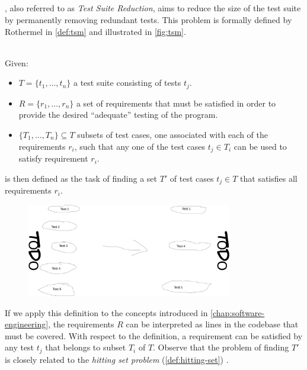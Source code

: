 
\subsection{\tsm{}}
\label{ssec:tsm}
\tsm{}, also referred to as \emph{Test Suite Reduction}, aims to reduce the size of the test suite by permanently removing redundant tests. This problem is formally defined by Rothermel in \autoref{def:tsm} \cite{10.1002/stv.430} and illustrated in \autoref{fig:tsm}. 

\begin{definition}[\tsm{}]
\label{def:tsm}
\mbox{}\\Given:
\begin{itemize}
	\item $T = \{t_1, \dots, t_n\}$ a test suite consisting of tests $t_j$.
	\item $R = \{r_1, \dots, r_n\}$ a set of requirements that must be satisfied in order to provide the desired ``adequate'' testing of the program.
	\item $\{T_1, \dots, T_n\} \subseteq T$ subsets of test cases, one associated with each of the requirements $r_i$, such that any one of the test cases $t_j \in T_i$ can be used to satisfy requirement $r_i$.
\end{itemize}

\noindent \tsm{} is then defined as the task of finding a set $T'$ of test cases $t_j \in T$ that satisfies all requirements $r_i$.
\end{definition}


\begin{figure}[htbp!]
	\centering
	\includegraphics[width=0.8\textwidth]{assets/images/approach-tsm.pdf}
	\caption{\tsm{}}
	\label{fig:tsm}
\end{figure}

\noindent If we apply this definition to the concepts introduced in \autoref{chap:software-engineering}, the requirements $R$ can be interpreted as lines in the codebase that must be covered. With respect to the definition, a requirement can be satisfied by any test $t_j$ that belongs to subset $T_i$ of $T$. Observe that the problem of finding $T'$ is closely related to the \emph{hitting set problem} (\autoref{def:hitting-set}) \cite{10.1002/stv.430}.

